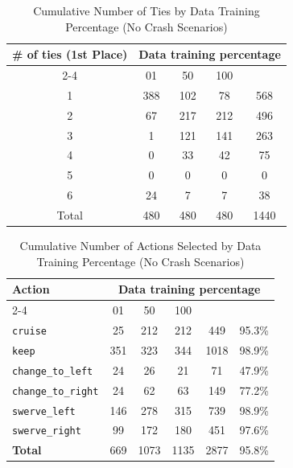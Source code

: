 \documentclass{article}
\begin{document}
\begin{table}[h]
\centering
\caption{Cumulative Number of Ties by Data Training Percentage (No Crash Scenarios)}
\begin{tabular}{c|ccc|c}
\toprule
\multirow{2}{*}{\# of ties (1st Place)} & \multicolumn{5}{c|}{Data training percentage} & \multirow{2}{*}{Total} \\
\cmidrule{2-4}
 & 01 & 50 & 100 & \\
\midrule
1 & 388 & 102 & 78 & 568 \\ 
2 & 67 & 217 & 212 & 496 \\ 
3 & 1 & 121 & 141 & 263 \\ 
4 & 0 & 33 & 42 & 75 \\ 
5 & 0 & 0 & 0 & 0 \\ 
6 & 24 & 7 & 7 & 38 \\ 
\midrule
Total & 480 & 480 & 480 & 1440 \\ 
\bottomrule
\end{tabular}
\end{table}

\begin{table}[h]
\centering
\caption{Cumulative Number of Actions Selected by Data Training Percentage (No Crash Scenarios)}
\begin{tabular}{l|ccc|c|c}
\toprule
\multirow{2}{*}{Action} & \multicolumn{5}{c|}{Data training percentage} & \multirow{2}{*}{Total} & \multirow{2}{*}{Safe (\%)} \\
\cmidrule{2-4}
 & 01 & 50  & 100 & & \\
\midrule
\texttt{cruise} & 25 & 212 & 212 & 449 & 95.3\% \\ 
\texttt{keep} & 351 & 323 & 344 & 1018 & 98.9\% \\ 
\texttt{change\_to\_left} & 24 & 26 & 21 & 71 & 47.9\% \\ 
\texttt{change\_to\_right} & 24 & 62 & 63 & 149 & 77.2\% \\ 
\texttt{swerve\_left} & 146 & 278 & 315 & 739 & 98.9\% \\ 
\texttt{swerve\_right} & 99 & 172 & 180 & 451 & 97.6\% \\ 
\midrule
\textbf{Total} & 669 & 1073 & 1135 & 2877 & 95.8\% \\ 
\bottomrule
\end{tabular}
\end{table}
\end{document}
